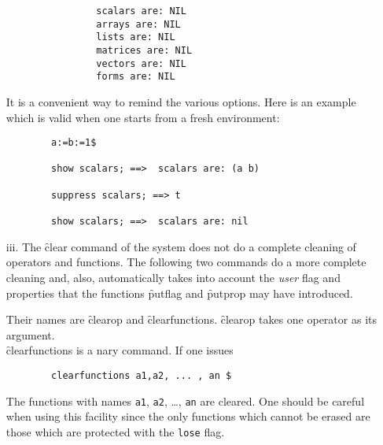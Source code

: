 \begin{itemize}
\begin{verbatim}
                scalars are: NIL
                arrays are: NIL
                lists are: NIL
                matrices are: NIL
                vectors are: NIL
                forms are: NIL
\end{verbatim}
It is a convenient way to remind the various options. Here is an example
which is valid when one starts from a fresh environment:
\begin{verbatim}
        a:=b:=1$

        show scalars; ==>  scalars are: (a b)

        suppress scalars; ==> t

        show scalars; ==>  scalars are: nil
\end{verbatim}
\item[iii.]
The \f{clear} command  of the system does not do a complete cleaning of
operators and functions. The following two commands do a more
complete cleaning and, also, automatically takes into account the
\emph{user} flag and properties that the functions
\f{putflag} and \f{putprop} may have introduced.

\hypertarget{operator:CLEAROP}{}
\hypertarget{operator:CLEARFUNCTIONS}{}
Their names are \f{clearop} and \f{clearfunctions}.
\f{clearop} takes one operator as its argument.\\
\f{clearfunctions} is a nary command. If one issues
\begin{verbatim}
        clearfunctions a1,a2, ... , an $
\end{verbatim}
The functions with names \texttt{a1}, \texttt{a2}, \ldots, \texttt{an} are cleared.
One should be careful when  using this facility since the
only functions which cannot be erased are those which are
protected with the \texttt{lose} flag.
\end{itemize}
